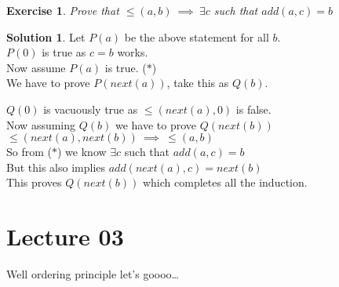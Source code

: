 \documentclass[a4paper,10pt]{article}
\newtheorem{exercise}{Exercise}[section]
\theoremstyle{definition} %
\newtheorem*{solution}{Solution}
\begin{document}
    \newpage
    \begin{exercise}
        Prove that $\leq(a,b) \ \implies \ \exists c$ such that $add(a,c) = b$
    \end{exercise}
    \begin{solution}
        Let $P(a)$ be the above statement for all $b$. \\
        $P(0)$ is true as $c = b$ works. \\ 
        Now assume $P(a)$ is true. \quad ($\ast$) \\
        We have to prove $P(next(a))$, take this as $Q(b)$.
        \begin{adjustwidth}{1cm}{0cm}
            $Q(0)$ is vacuously true as $\leq(next(a), 0)$ is false. \\
            Now assuming $Q(b)$ we have to prove $Q(next(b))$ \\
            $\leq(next(a), next(b)) \ \implies \ \leq(a,b)$ \\
            So from ($\ast$) we know $\exists c$ such that $add(a,c) = b$ \\
            But this also implies $add(next(a), c) = next(b)$ \\
            This proves $Q(next(b))$ which completes all the induction.
        \end{adjustwidth}
    \end{solution}

    \section{Lecture 03}
    Well ordering principle let's goooo\dots
\end{document}
